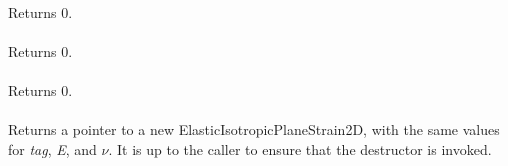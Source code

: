  \\
Returns $0$. \\

 \\
Returns $0$. \\

 \\
Returns $0$. \\

 \\
Returns a pointer to a new ElasticIsotropicPlaneStrain2D, with the
same values for {\em tag}, {\em E}, and $\nu$. It is up to the
caller to ensure that the destructor is invoked. \\
